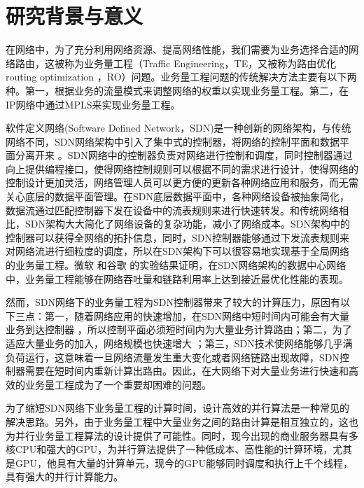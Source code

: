 \documentclass[master]{thesis-uestc}
\begin{document}
\begin{englishabstract}
\end{englishabstract}
\thesistableofcontents
\thesisfigurelist
\thesistablelist
\thesischapterexordium
\section{研究背景与意义}

在网络中，为了充分利用网络资源、提高网络性能，我们需要为业务选择合适的网络路由，这被称为业务量工程（Traffic Engineering，TE，又被称为路由优化 routing optimization ，RO）问题。业务量工程问题的传统解决方法主要有以下两种。第一，根据业务的流量模式来调整网络的权重以实现业务量工程。第二，在IP网络中通过MPLS来实现业务量工程。

软件定义网络(Software Defined Network，SDN)是一种创新的网络架构，与传统网络不同，SDN网络架构中引入了集中式的控制器，将网络的控制平面和数据平面分离开来 。SDN网络中的控制器负责对网络进行控制和调度，同时控制器通过向上提供编程接口，使得网络控制规则可以根据不同的需求进行设计，使得网络的控制设计更加灵活，网络管理人员可以更方便的更新各种网络应用和服务，而无需关心底层的数据平面管理。在SDN底层数据平面中，各种网络设备被抽象简化，数据流通过匹配控制器下发在设备中的流表规则来进行快速转发。和传统网络相比，SDN架构大大简化了网络设备的复杂功能，减小了网络成本。SDN架构中的控制器可以获得全网络的拓扑信息，同时，SDN控制器能够通过下发流表规则来对网络流进行细粒度的调度，所以在SDN架构下可以很容易地实现基于全局网络的业务量工程。微软 和谷歌 的实验结果证明，在SDN网络架构的数据中心网络中，业务量工程能够在网络吞吐量和链路利用率上达到接近最优化性能的表现。

然而，SDN网络下的业务量工程为SDN控制器带来了较大的计算压力，原因有以下三点：第一，随着网络应用的快速增加，在SDN网络中短时间内可能会有大量业务到达控制器 ，所以控制平面必须短时间内为大量业务计算路由；第二，为了适应大量业务的加入，网络规模也快速增大 ；第三，SDN技术使网络能够几乎满负荷运行，这意味着一旦网络流量发生重大变化或者网络链路出现故障，SDN控制器需要在短时间内重新计算出路由。因此，在大网络下对大量业务进行快速和高效的业务量工程成为了一个重要却困难的问题。

为了缩短SDN网络下业务量工程的计算时间，设计高效的并行算法是一种常见的解决思路。另外，由于业务量工程中大量业务之间的路由计算是相互独立的，这也为并行业务量工程算法的设计提供了可能性。同时，现今出现的商业服务器具有多核CPU和强大的GPU，为并行算法提供了一种低成本、高性能的计算环境，尤其是GPU，他具有大量的计算单元，现今的GPU能够同时调度和执行上千个线程，具有强大的并行计算能力。
\end{document}
